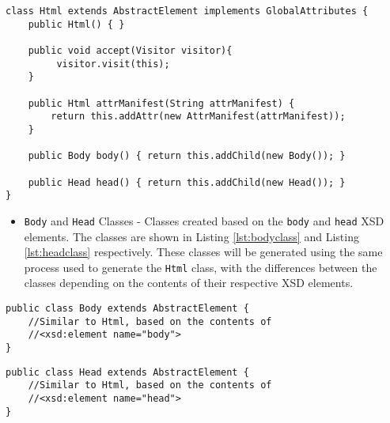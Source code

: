 
\begin{minipage}{\linewidth}
\begin{lstlisting}[caption={Html Class Corresponding to the XSD Element Named html},captionpos=b,label={lst:htmlclass}]
class Html extends AbstractElement implements GlobalAttributes {
    public Html() { }
    
    public void accept(Visitor visitor){
         visitor.visit(this);    
    }
    
    public Html attrManifest(String attrManifest) {
        return this.addAttr(new AttrManifest(attrManifest));
    }
    
    public Body body() { return this.addChild(new Body()); }
        
    public Head head() { return this.addChild(new Head()); }
}
\end{lstlisting}
\end{minipage}

\begin{itemize}
	\item \texttt{Body} and \texttt{Head} Classes - Classes created based on the \texttt{body} and \texttt{head} \ac{XSD} elements. The classes are shown in Listing \ref{lst:bodyclass} and Listing \ref{lst:headclass} respectively. These classes will be generated using the same process used to generate the \texttt{Html} class, with the differences between the classes depending on the contents of their respective \ac{XSD} elements.
\end{itemize}

\bigskip

\begin{minipage}{\linewidth}
\begin{lstlisting}[caption={Body Class Corresponding to the XSD Element Named body},captionpos=b,label={lst:bodyclass}]
public class Body extends AbstractElement {
    //Similar to Html, based on the contents of 
    //<xsd:element name="body">
}
\end{lstlisting}
\end{minipage}

\bigskip

\begin{minipage}{\linewidth}
\begin{lstlisting}[caption={Head Class Corresponding to the XSD Element Named head},captionpos=b,label={lst:headclass}]
public class Head extends AbstractElement {
    //Similar to Html, based on the contents of     
    //<xsd:element name="head">
}
\end{lstlisting}
\end{minipage}

